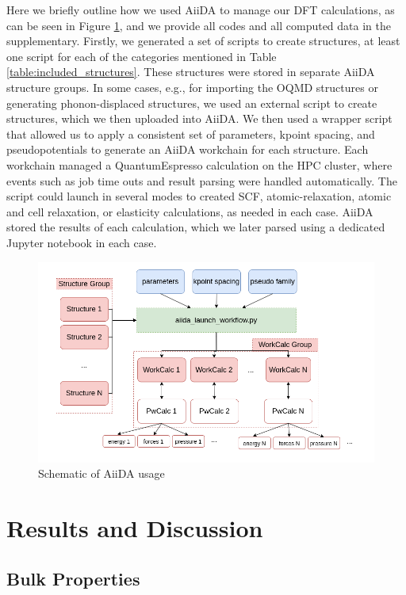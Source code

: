 \documentclass{article}
\begin{document}
Here we briefly outline how we used AiiDA to manage our DFT calculations, as can be seen in Figure \ref{fig:aiida_methods},
and we provide all codes and all computed data in the supplementary.
Firstly, we generated a set of scripts to create structures, at least one script for each of the categories mentioned in Table \ref{table:included_structures}.
These structures were stored in separate AiiDA structure groups.
In some cases, e.g., for importing the OQMD structures or generating phonon-displaced structures, we used an external script to create structures, which we then uploaded into AiiDA.
We then used a wrapper script that allowed us to apply a consistent set of parameters, kpoint spacing, and pseudopotentials to generate an AiiDA workchain for each structure.
Each workchain managed a QuantumEspresso calculation on the HPC cluster, 
where events such as job time outs and result parsing were handled automatically.
The script could launch in several modes to created SCF, atomic-relaxation, atomic and cell relaxation, or elasticity calculations, as needed in each case.
AiiDA stored the results of each calculation, which we later parsed using a dedicated Jupyter\cite{Kluyver2016JupyterWorkflows} notebook in each case. 
\begin{figure}[H]%
\centering%
\includegraphics[width=1.0\textwidth,center]{figures/recalculateDBschematic.png}%
\caption{Schematic of AiiDA usage}%
\label{fig:aiida_methods}
\end{figure}

\section{Results and Discussion}
\subsection{Bulk Properties}
\end{document}
